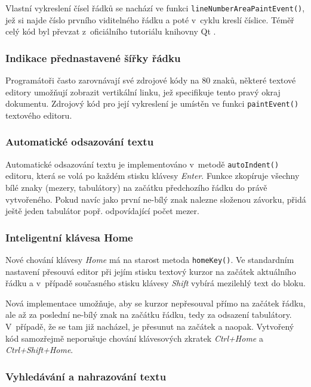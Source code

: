 \documentclass[11pt,twoside,a4paper]{book}
\begin{document}
Vlastní vykreslení čísel řádků se nachází ve funkci \texttt{lineNumberAreaPaintEvent()}, jež si najde číslo prvního viditelného řádku a poté v~cyklu kreslí číslice. Téměř celý kód byl převzat z~oficiálního tutoriálu knihovny Qt \cite{code_editor_example}.


\subsubsection{Indikace přednastavené šířky řádku}

Programátoři často zarovnávají své zdrojové kódy na 80 znaků, některé textové editory umožňují zobrazit vertikální linku, jež specifikuje tento pravý okraj dokumentu. Zdrojový kód pro její vykreslení je umístěn ve funkci \texttt{paintEvent()} textového editoru.


\subsubsection{Automatické odsazování textu}

Automatické odsazování textu je implementováno v~metodě \texttt{autoIndent()} editoru, která se volá po každém stisku klávesy \textit{Enter}. Funkce zkopíruje všechny bílé znaky (mezery, tabulátory) na začátku předchozího řádku do právě vytvořeného. Pokud navíc jako první ne-bílý znak nalezne složenou závorku, přidá ještě jeden tabulátor popř. odpovídající počet mezer.


\subsubsection{Inteligentní klávesa Home}

Nové chování klávesy \textit{Home} má na starost metoda \texttt{homeKey()}. Ve standardním nastavení přesouvá editor při jejím stisku textový kurzor na začátek aktuálního řádku a v~případě současného stisku klávesy \textit{Shift} vybírá mezilehlý text do bloku.

Nová implementace umožňuje, aby se kurzor nepřesouval přímo na začátek řádku, ale až za poslední ne-bílý znak na začátku řádku, tedy za odsazení tabulátory. V~případě, že se tam již nacházel, je přesunut na začátek a naopak. Vytvořený kód samozřejmě neporušuje chování klávesových zkratek \textit{Ctrl+Home} a \textit{Ctrl+Shift+Home}.


\subsubsection{Vyhledávání a nahrazování textu}
\end{document}
